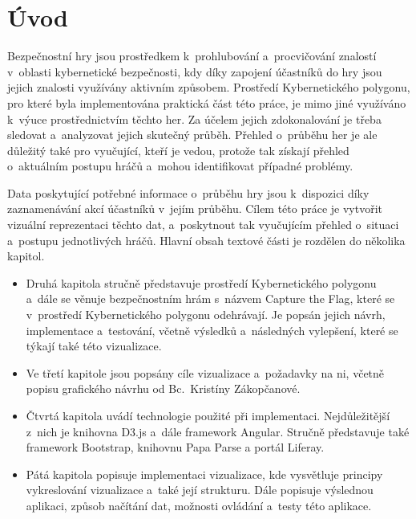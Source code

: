 \documentclass[
  digital, %
  oneside, %
  table,   %
  nolof,     %
  nolot,     %
  nocover
]{fithesis3}
\begin{document}
\chapter{Úvod}
Bezpečnostní hry jsou prostředkem k~prohlubování a~procvičování znalostí v~oblasti kybernetické bezpečnosti, kdy díky zapojení účastníků do hry jsou jejich znalosti využívány aktivním způsobem. Prostředí Kybernetického polygonu, pro které byla implementována praktická část této práce, je mimo jiné využíváno k~výuce prostřednictvím těchto her. Za účelem jejich zdokonalování je třeba sledovat a~analyzovat jejich skutečný průběh. Přehled o~průběhu her je ale důležitý také pro vyučující, kteří je vedou, protože tak získají přehled o~aktuálním postupu hráčů a~mohou identifikovat případné problémy.\par
Data poskytující potřebné informace o~průběhu hry jsou k~dispozici díky zaznamenávání akcí účastníků v~jejím průběhu. Cílem této práce je vytvořit vizuální reprezentaci těchto dat, a~poskytnout tak vyučujícím přehled o~situaci a~postupu jednotlivých hráčů.
Hlavní obsah textové části je rozdělen do několika kapitol.
\begin{itemize}
  \item Druhá kapitola stručně představuje prostředí Kybernetického polygonu a~dále se věnuje bezpečnostním hrám s~názvem Capture the Flag, které se v~prostředí Kybernetického polygonu odehrávají. Je popsán jejich návrh, implementace a~testování, včetně výsledků a~následných vylepšení, které se týkají také této vizualizace.
  \item Ve třetí kapitole jsou popsány cíle vizualizace a~požadavky na ni, včetně popisu grafického návrhu od Bc.~Kristíny Zákopčanové.
  \item Čtvrtá kapitola uvádí technologie použité při implementaci. Nejdůležitější z~nich je knihovna D3.js a~dále framework Angular. Stručně představuje také framework Bootstrap, knihovnu Papa Parse a portál Liferay.
  \item Pátá kapitola popisuje implementaci vizualizace, kde vysvětluje principy vykreslování vizualizace a~také její strukturu. Dále popisuje výslednou aplikaci, způsob načítání dat, možnosti ovládání a~testy této aplikace.
\end{itemize}
\end{document}

